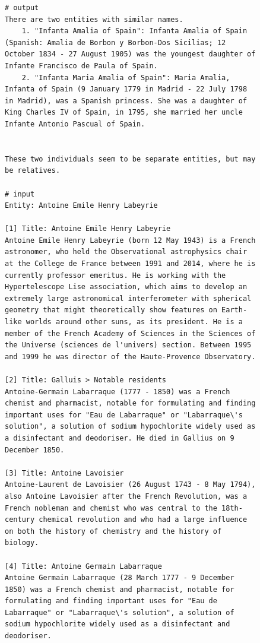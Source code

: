 \documentclass[11pt]{article}
\begin{document}
\begin{figure}[htb]
\begin{lstlisting}
# output
There are two entities with similar names.
    1. "Infanta Amalia of Spain": Infanta Amalia of Spain (Spanish: Amalia de Borbon y Borbon-Dos Sicilias; 12 October 1834 - 27 August 1905) was the youngest daughter of Infante Francisco de Paula of Spain.
    2. "Infanta Maria Amalia of Spain": Maria Amalia, Infanta of Spain (9 January 1779 in Madrid - 22 July 1798 in Madrid), was a Spanish princess. She was a daughter of King Charles IV of Spain, in 1795, she married her uncle Infante Antonio Pascual of Spain.


These two individuals seem to be separate entities, but may be relatives.

# input
Entity: Antoine Emile Henry Labeyrie

[1] Title: Antoine Emile Henry Labeyrie
Antoine Emile Henry Labeyrie (born 12 May 1943) is a French astronomer, who held the Observational astrophysics chair at the College de France between 1991 and 2014, where he is currently professor emeritus. He is working with the Hypertelescope Lise association, which aims to develop an extremely large astronomical interferometer with spherical geometry that might theoretically show features on Earth-like worlds around other suns, as its president. He is a member of the French Academy of Sciences in the Sciences of the Universe (sciences de l'univers) section. Between 1995 and 1999 he was director of the Haute-Provence Observatory.

[2] Title: Galluis > Notable residents
Antoine-Germain Labarraque (1777 - 1850) was a French chemist and pharmacist, notable for formulating and finding important uses for "Eau de Labarraque" or "Labarraque\'s solution", a solution of sodium hypochlorite widely used as a disinfectant and deodoriser. He died in Gallius on 9 December 1850.

[3] Title: Antoine Lavoisier
Antoine-Laurent de Lavoisier (26 August 1743 - 8 May 1794), also Antoine Lavoisier after the French Revolution, was a French nobleman and chemist who was central to the 18th-century chemical revolution and who had a large influence on both the history of chemistry and the history of biology.

[4] Title: Antoine Germain Labarraque
Antoine Germain Labarraque (28 March 1777 - 9 December 1850) was a French chemist and pharmacist, notable for formulating and finding important uses for "Eau de Labarraque" or "Labarraque\'s solution", a solution of sodium hypochlorite widely used as a disinfectant and deodoriser.


\end{lstlisting}
\end{figure}
\end{document}
